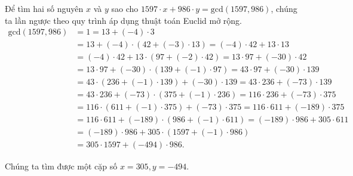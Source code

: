 \begin{example}
	Để tìm hai số nguyên $x$ và $y$ sao cho $1597\cdot x + 986\cdot y = \text{gcd}(1597, 986)$, chúng ta lần ngược theo quy trình áp dụng thuật toán Euclid mở rộng.
	\begin{align*}
		\text{gcd}(1597, 986) & = 1 = 13 + (-4)\cdot 3                                                               \\
		                      & = 13 + (-4)\cdot (42 + (-3)\cdot 13) = (-4)\cdot 42 + 13\cdot 13                     \\
		                      & = (-4)\cdot 42 + 13\cdot (97 + (-2)\cdot 42) = 13\cdot 97 + (-30)\cdot 42            \\
		                      & = 13\cdot 97 + (-30)\cdot (139 + (-1)\cdot 97) = 43\cdot 97 + (-30)\cdot 139         \\
		                      & = 43\cdot (236 + (-1)\cdot 139) + (-30)\cdot 139 = 43\cdot 236 + (-73)\cdot 139      \\
		                      & = 43\cdot 236 + (-73)\cdot (375 + (-1)\cdot 236) = 116\cdot 236 + (-73)\cdot 375     \\
		                      & = 116\cdot (611 + (-1)\cdot 375) + (-73)\cdot 375 = 116\cdot 611 + (-189)\cdot 375   \\
		                      & = 116\cdot 611 + (-189)\cdot (986 + (-1)\cdot 611)  = (-189)\cdot 986 + 305\cdot 611 \\
		                      & = (-189)\cdot 986 + 305\cdot (1597 + (-1)\cdot 986)                                  \\
		                      & = 305\cdot 1597 + (-494)\cdot 986.
	\end{align*}

	Chúng ta tìm được một cặp số $x = 305, y = -494$.
\end{example}

